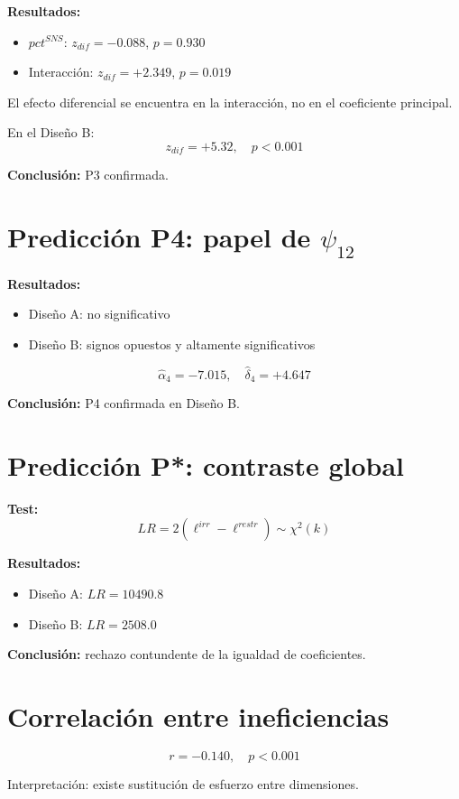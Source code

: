 \documentclass[12pt]{article}
\begin{document}
\textbf{Resultados:}
\begin{itemize}
\item $pct^{SNS}$: $z_{dif} = -0.088$, $p = 0.930$
\item Interacción: $z_{dif} = +2.349$, $p = 0.019$
\end{itemize}

El efecto diferencial se encuentra en la interacción, no en el coeficiente principal.

En el Diseño B:
\[
z_{dif} = +5.32, \quad p < 0.001
\]

\textbf{Conclusión:} P3 confirmada.

\section{Predicción P4: papel de $\psi_{12}$}

\textbf{Resultados:}

\begin{itemize}
\item Diseño A: no significativo
\item Diseño B: signos opuestos y altamente significativos
\end{itemize}

\[
\hat{\alpha}_4 = -7.015, \quad \hat{\delta}_4 = +4.647
\]

\textbf{Conclusión:} P4 confirmada en Diseño B.

\section{Predicción P*: contraste global}

\textbf{Test:}
\[
LR = 2(\ell^{irr} - \ell^{restr}) \sim \chi^2(k)
\]

\textbf{Resultados:}
\begin{itemize}
\item Diseño A: $LR = 10490.8$
\item Diseño B: $LR = 2508.0$
\end{itemize}

\textbf{Conclusión:} rechazo contundente de la igualdad de coeficientes.

\section{Correlación entre ineficiencias}

\[
r = -0.140, \quad p < 0.001
\]

Interpretación: existe sustitución de esfuerzo entre dimensiones.
\end{document}
